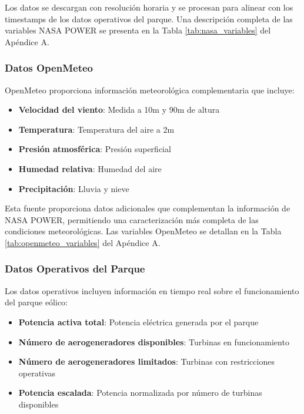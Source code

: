 \documentclass[conference]{IEEEtran}
\begin{document}
Los datos se descargan con resolución horaria y se procesan para alinear con los timestamps de los datos operativos del parque. Una descripción completa de las variables NASA POWER se presenta en la Tabla \ref{tab:nasa_variables} del Apéndice A.
	
\subsubsection{Datos OpenMeteo}

OpenMeteo proporciona información meteorológica complementaria que incluye:
\begin{itemize}

\item \textbf{Velocidad del viento}: Medida a 10m y 90m de altura

\item \textbf{Temperatura}: Temperatura del aire a 2m

\item \textbf{Presión atmosférica}: Presión superficial

\item \textbf{Humedad relativa}: Humedad del aire

\item \textbf{Precipitación}: Lluvia y nieve

\end{itemize}
	
Esta fuente proporciona datos adicionales que complementan la información de NASA POWER, permitiendo una caracterización más completa de las condiciones meteorológicas. Las variables OpenMeteo se detallan en la Tabla \ref{tab:openmeteo_variables} del Apéndice A.
	
\subsubsection{Datos Operativos del Parque}
Los datos operativos incluyen información en tiempo real sobre el funcionamiento del parque eólico:

\begin{itemize}
\item \textbf{Potencia activa total}: Potencia eléctrica generada por el parque

\item \textbf{Número de aerogeneradores disponibles}: Turbinas en funcionamiento

\item \textbf{Número de aerogeneradores limitados}: Turbinas con restricciones operativas

\item \textbf{Potencia escalada}: Potencia normalizada por número de turbinas disponibles

\end{itemize}
	
\end{document}
